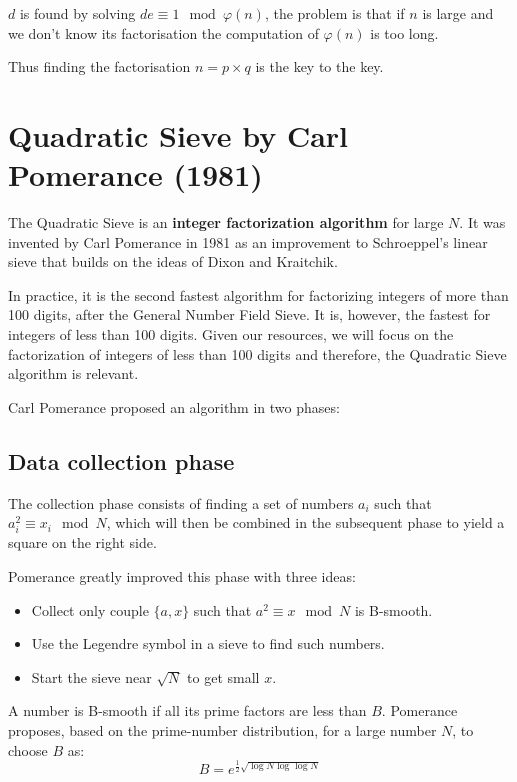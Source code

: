 \documentclass[a4paper, 11pt]{article}
\begin{document}
$d$ is found by solving $de \equiv 1 \mod \varphi(n)$, the problem is that if $n$ is large and we don't know its factorisation the computation of $\varphi(n)$ is too long.

Thus finding the factorisation $n = p \times q$ is the key to the key.

\section{Quadratic Sieve by Carl Pomerance (1981)}

The Quadratic Sieve is an \textbf{integer factorization algorithm} for large $N$. It was invented by Carl Pomerance in 1981 as an improvement to Schroeppel's linear sieve that builds on the ideas of Dixon and Kraitchik.

In practice, it is the second fastest algorithm for factorizing integers of more than 100 digits, after the General Number Field Sieve. It is, however, the fastest for integers of less than 100 digits. Given our resources, we will focus on the factorization of integers of less than 100 digits and therefore, the Quadratic Sieve algorithm is relevant.

Carl Pomerance proposed an algorithm in two phases:


\subsection{Data collection phase}

The collection phase consists of finding a set of numbers $a_i$ such that $a_i^2 \equiv x_i \mod N$, which will then be combined in the subsequent phase to yield a square on the right side.


Pomerance greatly improved this phase with three ideas:
\begin{itemize}
    \item Collect only couple $\{a, x\}$ such that $a^2 \equiv x \mod N$ is B-smooth.
    \item Use the Legendre symbol in a sieve to find such numbers.
    \item Start the sieve near $\sqrt{N}$ to get small $x$.
\end{itemize}   

A number is B-smooth if all its prime factors are less than $B$. Pomerance proposes, based on the prime-number distribution, for a large number $N$, to choose $B$ as:
\begin{equation}
    B = e^{\frac{1}{2}  \sqrt{\log N \log \log N}}
\end{equation}
\end{document}
